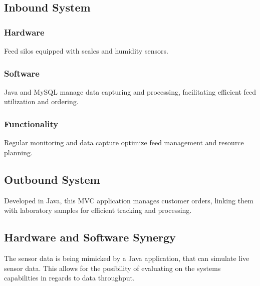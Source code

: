 \documentclass[conference]{IEEEtran}
\begin{document}
\subsection{Inbound System}
\subsubsection{Hardware}
Feed silos equipped with scales and humidity sensors.
\subsubsection{Software}
Java and MySQL manage data capturing and processing, facilitating efficient feed utilization and ordering.
\subsubsection{Functionality}
Regular monitoring and data capture optimize feed management and resource planning.

\subsection{Outbound System}
Developed in Java, this MVC application manages customer orders, linking them with laboratory samples for efficient tracking and processing.

\subsection{Hardware and Software Synergy}
The sensor data is being mimicked by a Java application, that can simulate live sensor data. This allows for the posibility of evaluating on the systems capabilities in regards to data throughput.
\end{document}
